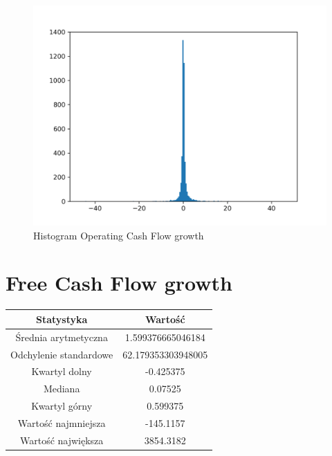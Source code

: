 \documentclass{article}
\begin{document}
\begin{figure}[h!]
    \includegraphics[width=\linewidth]{variables/Operating Cash Flow growth.png}
    \caption{Histogram Operating Cash Flow growth }
\end{figure}\section{ Free Cash Flow growth }

\begin{center}
    \begin{tabular}{|c | c|} 
    \hline
    Statystyka & Wartość \\
    \hline\hline
    Średnia arytmetyczna & 1.599376665046184 \\ 
    \hline
    Odchylenie standardowe & 62.179353303948005 \\
    \hline
    Kwartyl dolny & -0.425375 \\
    \hline
    Mediana & 0.07525 \\
    \hline
    Kwartyl górny & 0.599375 \\
    \hline
    Wartość najmniejsza & -145.1157 \\
    \hline
    Wartość największa & 3854.3182 \\
    \hline
   \end{tabular}
\end{center}
\end{document}
